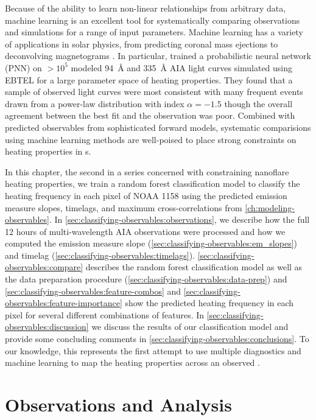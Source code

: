 Because of the ability to learn non-linear relationships from arbitrary data, machine learning  is an excellent tool for systematically comparing observations and simulations for a range of input parameters. Machine learning has a variety of applications in solar physics, from predicting coronal mass ejections \citep[e.g.][]{bobra_predicting_2016} to deconvolving magnetograms \citep{baso_enhancing_2018}. In particular, \citet{tajfirouze_time-resolved_2016} trained a probabilistic neural network (PNN) on  $>10^5$ modeled \SI{94}{\angstrom} and \SI{335}{\angstrom} AIA light curves simulated using EBTEL for a large parameter space of heating properties. They found that a sample of observed light curves were most consistent with many frequent events drawn from a power-law distribution with index $\alpha=-1.5$ though the overall agreement between the best fit and the observation was poor. Combined with predicted observables from sophisticated forward models, systematic comparisions using machine learning methods are well-poised to place strong constraints on heating properties in \AR s.

In this chapter, the second in a series concerned with constraining nanoflare heating properties, we train a random forest classification model to classify the heating frequency in each pixel of \AR{} NOAA 1158 using the predicted emission measure slopes, timelags, and maximum cross-correlations from \autoref{ch:modeling-observables}. In \autoref{sec:classifying-observables:observations}, we describe how the full 12 hours of multi-wavelength AIA observations were processed and how we computed the emission measure slope (\autoref{sec:classifying-observables:em_slopes}) and timelag (\autoref{sec:classifying-observables:timelags}). \autoref{sec:classifying-observables:compare} describes the random forest classification model as well as the data preparation procedure (\autoref{sec:classifying-observables:data-prep}) and \autoref{sec:classifying-observables:feature-combos} and \ref{sec:classifying-observables:feature-importance} show the predicted heating frequency in each pixel for several different combinations of features. In \autoref{sec:classifying-observables:discussion} we discuss the results of our classification model and provide some concluding comments in \autoref{sec:classifying-observables:conclusions}. To our knowledge, this represents the first attempt to use multiple diagnostics and machine learning to map the heating properties across an observed \AR{}.

\section{Observations and Analysis}\label{sec:classifying-observables:observations}


